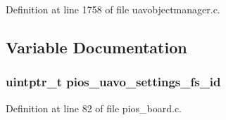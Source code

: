 \-Definition at line 1758 of file uavobjectmanager.\-c.



\subsection{\-Variable \-Documentation}
\hypertarget{group___u_a_v_object_handling_gab060f441dd600b08386c0ca1b487217a}{
\subsubsection[{pios\-\_\-uavo\-\_\-settings\-\_\-fs\-\_\-id}]{\setlength{\rightskip}{0pt plus 5cm}uintptr\-\_\-t {\bf pios\-\_\-uavo\-\_\-settings\-\_\-fs\-\_\-id}}}\label{group___u_a_v_object_handling_gab060f441dd600b08386c0ca1b487217a}


\-Definition at line 82 of file pios\-\_\-board.\-c.

